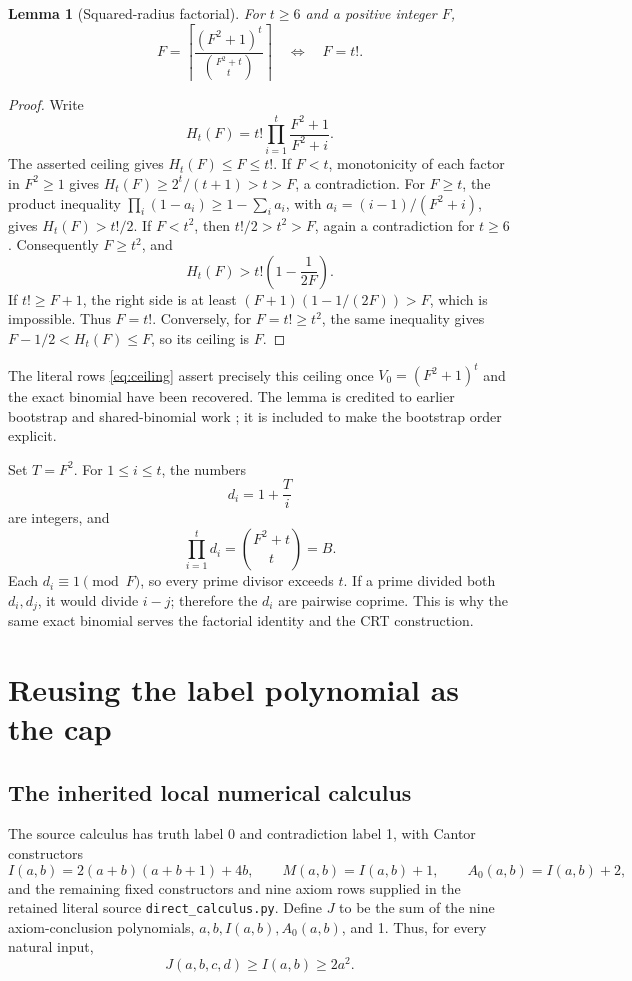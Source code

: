 \documentclass[11pt,a4paper]{article}
\newtheorem{lemma}[theorem]{Lemma}
\theoremstyle{remark}
\newcommand{\qref}[1]{\nolinkurl{#1}}
\begin{document}
\begin{lemma}[Squared-radius factorial]\label{lem:factorial}
For \(t\ge6\) and a positive integer \(F\),
\[
 F=\left\lceil\frac{(F^2+1)^t}{\binom{F^2+t}{t}}\right\rceil
 \quad\Longleftrightarrow\quad F=t!.
\]
\end{lemma}
\begin{proof}
Write
\[
 H_t(F)=t!\prod_{i=1}^t\frac{F^2+1}{F^2+i}.
\]
The asserted ceiling gives \(H_t(F)\le F\le t!\). If \(F<t\),
monotonicity of each factor in \(F^2\ge1\) gives
\(H_t(F)\ge2^t/(t+1)>t>F\), a contradiction.
For \(F\ge t\), the product inequality
\(\prod_i(1-a_i)\ge1-\sum_i a_i\), with
\(a_i=(i-1)/(F^2+i)\), gives \(H_t(F)>t!/2\).
If \(F<t^2\), then \(t!/2>t^2>F\), again a contradiction for \(t\ge6\).
Consequently \(F\ge t^2\), and
\[
 H_t(F)>t!\left(1-\frac1{2F}\right).
\]
If \(t!\ge F+1\), the right side is at least
\((F+1)(1-1/(2F))>F\), which is impossible. Thus \(F=t!\).
Conversely, for \(F=t!\ge t^2\), the same inequality gives
\(F-1/2<H_t(F)\le F\), so its ceiling is \(F\).
\end{proof}

The literal rows \eqref{eq:ceiling} assert precisely this ceiling once
\(V_0=(F^2+1)^t\) and the exact binomial have been recovered. The lemma
is credited to earlier bootstrap and shared-binomial work
\cite{sharedbinomial}; it is included to make the bootstrap order explicit.

Set \(T=F^2\). For \(1\le i\le t\), the numbers
\[
 d_i=1+\frac{T}{i}
\]
are integers, and
\begin{equation}\label{eq:crtproduct}
 \prod_{i=1}^t d_i=\binom{F^2+t}{t}=B.
\end{equation}
Each \(d_i\equiv1\pmod F\), so every prime divisor exceeds \(t\).
If a prime divided both \(d_i,d_j\), it would divide \(i-j\); therefore
the \(d_i\) are pairwise coprime. This is why the same exact binomial
serves the factorial identity and the CRT construction.

\section{Reusing the label polynomial as the cap}\label{sec:anchor}

\subsection{The inherited local numerical calculus}

The source calculus has truth label 0 and contradiction label 1, with Cantor
constructors
\[
 I(a,b)=2(a+b)(a+b+1)+4b,\qquad
 M(a,b)=I(a,b)+1,\qquad A_0(a,b)=I(a,b)+2,
\]
and the remaining fixed constructors and nine axiom rows supplied in the
retained literal source \qref{direct_calculus.py}. Define \(J\) to be the
sum of the nine axiom-conclusion polynomials, \(a,b,I(a,b),A_0(a,b)\), and
1. Thus, for every natural input,
\begin{equation}\label{eq:Jgrowth}
 J(a,b,c,d)\ge I(a,b)\ge2a^2.
\end{equation}
\end{document}
